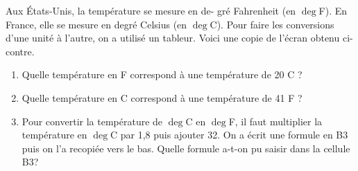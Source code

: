 
Aux États-Unis, la température se mesure en de-
gré Fahrenheit (en $\deg$F). En France, elle se mesure
en degré Celsius (en $\deg$C). Pour faire les conversions
d’une unité à l’autre, on a utilisé un tableur.
Voici une copie de l’écran obtenu ci-contre.

 

\begin{enumerate}
\item Quelle température en \°F correspond à une température de 20 \°C ?
\item Quelle température en \°C correspond à une température de 41 \°F ?
\item Pour convertir la température de $\deg$C en $\deg$F, il faut multiplier
la température en
$\deg$C par 1,8 puis ajouter 32.
On a écrit une formule en B3 puis on l’a recopiée vers le bas.
Quelle formule a-t-on pu saisir dans la cellule B3?
\end{enumerate}